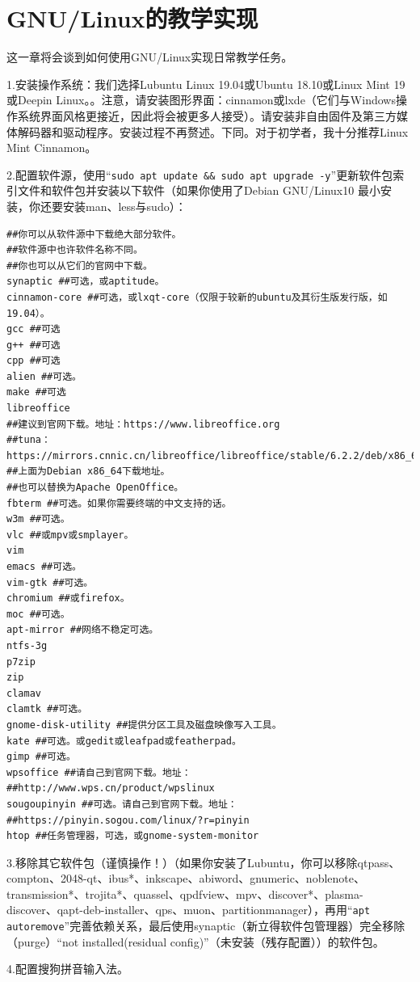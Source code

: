 \section{GNU/Linux的教学实现}
这一章将会谈到如何使用GNU/Linux实现日常教学任务。\par
1.安装操作系统：我们选择Lubuntu Linux 19.04或Ubuntu 18.10或Linux Mint 19 或Deepin Linux。。注意，请安装图形界面：cinnamon或lxde（它们与Windows操作系统界面风格更接近，因此将会被更多人接受）。请安装非自由固件及第三方媒体解码器和驱动程序。安装过程不再赘述。下同。对于初学者，我十分推荐Linux Mint Cinnamon。\par
2.配置软件源，使用“\verb|sudo apt update && sudo apt upgrade -y|”更新软件包索引文件和软件包并安装以下软件（如果你使用了Debian GNU/Linux10 最小安装，你还要安装man、less与sudo）：
\begin{verbatim}
##你可以从软件源中下载绝大部分软件。
##软件源中也许软件名称不同。
##你也可以从它们的官网中下载。
synaptic ##可选，或aptitude。
cinnamon-core ##可选，或lxqt-core（仅限于较新的ubuntu及其衍生版发行版，如19.04）。
gcc ##可选
g++ ##可选
cpp ##可选
alien ##可选。
make ##可选
libreoffice
##建议到官网下载。地址：https://www.libreoffice.org
##tuna：https://mirrors.cnnic.cn/libreoffice/libreoffice/stable/6.2.2/deb/x86_64/
##上面为Debian x86_64下载地址。
##也可以替换为Apache OpenOffice。
fbterm ##可选。如果你需要终端的中文支持的话。
w3m ##可选。
vlc ##或mpv或smplayer。
vim
emacs ##可选。
vim-gtk ##可选。
chromium ##或firefox。
moc ##可选。
apt-mirror ##网络不稳定可选。
ntfs-3g
p7zip
zip
clamav
clamtk ##可选。
gnome-disk-utility ##提供分区工具及磁盘映像写入工具。
kate ##可选。或gedit或leafpad或featherpad。
gimp ##可选。
wpsoffice ##请自己到官网下载。地址：
##http://www.wps.cn/product/wpslinux
sougoupinyin ##可选。请自己到官网下载。地址：
##https://pinyin.sogou.com/linux/?r=pinyin
htop ##任务管理器，可选，或gnome-system-monitor
\end{verbatim} \par
3.移除其它软件包（谨慎操作！）（如果你安装了Lubuntu，你可以移除qtpass、compton、2048-qt、ibus*、inkscape、abiword、gnumeric、noblenote、transmission*、trojita*、quassel、qpdfview、mpv、discover*、plasma-discover、qapt-deb-installer、qps、muon、partitionmanager），再用“\verb|apt autoremove|”完善依赖关系，最后使用synaptic（新立得软件包管理器）完全移除（purge）“not installed(residual config)”（未安装（残存配置））的软件包。\par
4.配置搜狗拼音输入法。
